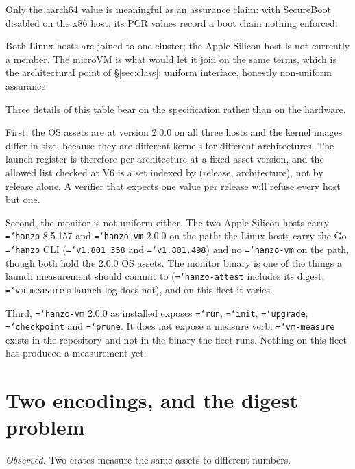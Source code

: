 \documentclass[11pt,a4paper]{article}
\newcommand{\code}[1]{\texttt{\hyphenchar\font=`\-\relax #1}}
\begin{document}
\noindent
Only the aarch64 value is meaningful as an assurance claim: with SecureBoot
disabled on the x86 host, its PCR values record a boot chain nothing enforced.

Both Linux hosts are joined to one cluster; the Apple-Silicon host is not currently
a member. The microVM is what would let it join on the same terms, which is the
architectural point of \S\ref{sec:class}: uniform interface, honestly non-uniform
assurance.

Three details of this table bear on the specification rather than on the hardware.

First, the OS assets are at version 2.0.0 on all three hosts and the kernel images
differ in size, because they are different kernels for different architectures.
The launch register is therefore per-architecture at a fixed asset version, and the
allowed list checked at V6 is a set indexed by (release, architecture), not by
release alone. A verifier that expects one value per release will refuse every host
but one.

Second, the monitor is not uniform either. The two Apple-Silicon hosts carry
\code{hanzo} 8.5.157 and \code{hanzo-vm} 2.0.0 on the path; the Linux hosts carry
the Go \code{hanzo} CLI (\code{v1.801.358} and \code{v1.801.498}) and no
\code{hanzo-vm} on the path, though both hold the 2.0.0 OS assets. The monitor
binary is one of the things a launch measurement should commit to
(\code{hanzo-attest} includes its digest; \code{vm-measure}'s launch log does not),
and on this fleet it varies.

Third, \code{hanzo-vm} 2.0.0 as installed exposes \code{run}, \code{init},
\code{upgrade}, \code{checkpoint} and \code{prune}. It does not expose a measure
verb: \code{vm-measure} exists in the repository and not in the binary the fleet
runs. Nothing on this fleet has produced a measurement yet.

\section{Two encodings, and the digest problem}
\label{app:encoding}

\emph{Observed.} Two crates measure the same assets to different numbers.
\end{document}
